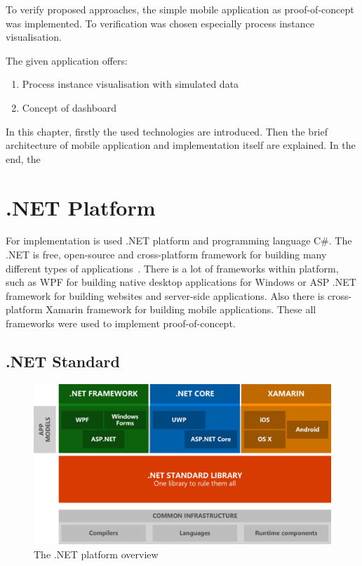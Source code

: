 To verify proposed approaches, the simple mobile application as proof-of-concept was implemented. To verification was chosen especially process instance visualisation.

The given application offers:
\begin{enumerate}
\item Process instance visualisation with simulated data
\item Concept of dashboard
\end{enumerate}

In this chapter, firstly the used technologies are introduced. Then the brief architecture of mobile application and implementation itself are explained. In the end, the
\section{.NET Platform}

For implementation is used .NET platform and programming language C\#. The .NET is free, open-source and cross-platform framework for building many different types of applications~\cite{what-is-dotnet}. There is a lot of frameworks within platform, such as WPF for building native desktop applications for Windows or ASP .NET framework for building websites and server-side applications. Also there is cross-platform Xamarin framework for building mobile applications. These all frameworks were used to implement proof-of-concept. 
\subsection{.NET Standard}
\begin{figure}[ht!]
\centering
\includegraphics[width=12cm,keepaspectratio]{img/dotnet-overview}
\caption{The .NET platform overview \cite{introducing-dotnet-standard}}
\label{fig:dotnet-overview}
\end{figure}

